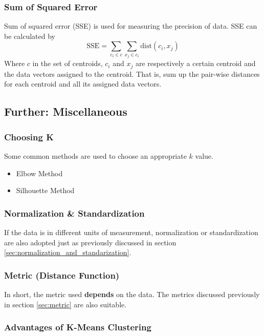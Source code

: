 \documentclass{note}
\begin{document}
\subsubsection{Sum of Squared Error}

Sum of squared error (SSE) is used for measuring the precision of data. SSE can be calculated by
$$
\text{SSE} = \sum_{c_i \in c} \sum_{x_j \in c_i} \text{dist}(c_i, x_j)
$$
Where $c$ in the set of centroids, $c_i$ and $x_j$ are respectively a certain centroid and the data vectors assigned to the centroid. That is, sum up the pair-wise distances for each centroid and all its assigned data vectors.

\subsection{Further: Miscellaneous}

\subsubsection{Choosing K}

Some common methods are used to choose an appropriate $k$ value.
\begin{itemize}
    \item Elbow Method
    \item Silhouette Method
\end{itemize}

\subsubsection{Normalization \& Standardization}

If the data is in different units of measurement, normalization or standardization are also adopted just as previously discussed in section \ref{sec:normalization_and_standarization}.

\subsubsection{Metric (Distance Function)}

In short, the metric used \textbf{depends} on the data. The metrics discussed previously in section \ref{sec:metric} are also suitable.

\subsubsection{Advantages of K-Means Clustering}
\end{document}

